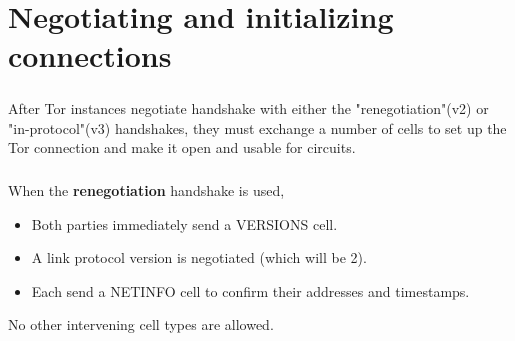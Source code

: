 \chapter{Negotiating and initializing connections}


\paragraph{}
After Tor instances negotiate handshake with either the
"renegotiation"(v2) or "in-protocol"(v3) handshakes, they must exchange
a number of cells to set up the Tor connection  and make it
open and usable for circuits.

\paragraph{}
When the \textbf{renegotiation} handshake is used,
\begin{itemize}
    \item Both parties immediately send a VERSIONS cell.
    \item A link protocol version is negotiated (which will be 2).
    \item Each send a NETINFO cell to confirm their addresses and timestamps.
\end{itemize}
No other intervening cell types are allowed.

